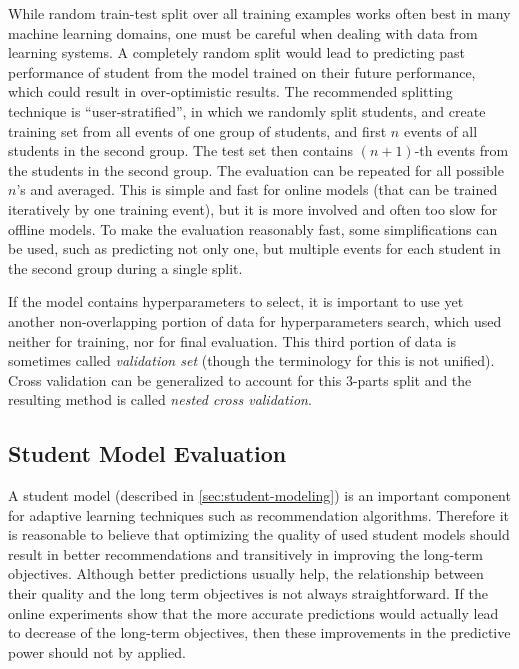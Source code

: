 While random train-test split over all training examples works often
  best in many machine learning domains,
  one must be careful when dealing with data from learning systems.
A completely random split would lead to predicting past performance
  of student from the model trained on their future performance,
  which could result in over-optimistic results.
The recommended splitting technique is ``user-stratified'',
  in which we randomly split students,
  and create training set from all events of one group of students,
  and first $n$ events of all students in the second group.
The test set then contains $(n+1)$-th events from the students
  in the second group.
The evaluation can be repeated for all possible $n$'s and averaged.
This is simple and fast for online models
  (that can be trained iteratively by one training event),
  but it is more involved and often too slow for offline models.
To make the evaluation reasonably fast,
  some simplifications can be used,
  such as predicting not only one, but multiple events
  for each student in the second group during a single split.


If the model contains hyperparameters to select,
  it is important to use yet another non-overlapping portion
  of data for hyperparameters search,
  which used neither for training, nor for final evaluation.
This third portion of data is sometimes called \emph{validation set}
  (though the terminology for this is not unified).
Cross validation can be generalized to account for this 3-parts split
  and the resulting method is called \emph{nested cross validation}.


\subsection{Student Model Evaluation}
\label{sec:student-model-evaluation}

A student model (described in \ref{sec:student-modeling})
  is an important component for adaptive learning techniques
  such as recommendation algorithms.
Therefore it is reasonable to believe that optimizing the quality
  of used student models should result in better recommendations
  and transitively in improving the long-term objectives.
Although better predictions usually help,
  the relationship between their quality and the long term objectives
  is not always straightforward.
If the online experiments show that the more accurate predictions would actually
  lead to decrease of the long-term objectives,
  then these improvements in the predictive power should not by applied.

